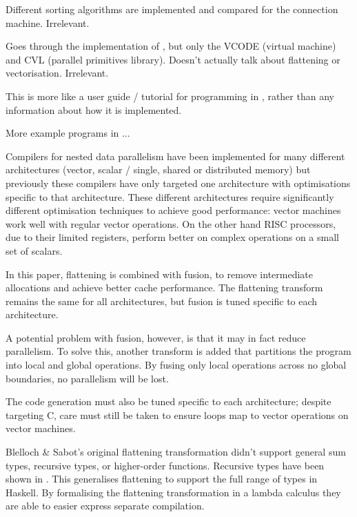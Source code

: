 Different sorting algorithms are implemented and compared for the connection machine. Irrelevant.

Goes through the implementation of \nesl, but only the VCODE (virtual machine) and CVL (parallel primitives library).
Doesn't actually talk about flattening or vectorisation.
Irrelevant.

This is more like a user guide / tutorial for programming in \nesl, rather than any information about how it is implemented.

More example programs in \nesl...


Compilers for nested data parallelism have been implemented for many different architectures (vector, scalar / single, shared or distributed memory)
but previously these compilers have only targeted one architecture with optimisations specific to that architecture.
These different architectures require significantly different optimisation techniques to achieve good performance:
vector machines work well with regular vector operations.
On the other hand RISC processors, due to their limited registers,
perform better on complex operations on a small set of scalars.

In this paper, flattening is combined with fusion, to remove intermediate allocations and achieve better cache performance.
The flattening transform remains the same for all architectures, but fusion is tuned specific to each architecture.

A potential problem with fusion, however, is that it may in fact reduce parallelism. 
To solve this, another transform is added that partitions the program into local and global operations.
By fusing only local operations across no global boundaries, no parallelism will be lost.

The code generation must also be tuned specific to each architecture; despite targeting C,
care must still be taken to ensure loops map to vector operations on vector machines.


Blelloch \& Sabot's original flattening transformation didn't support general sum types, recursive types, or higher-order functions. Recursive types have been shown in \cite{keller1998flattening}.
This generalises flattening to support the full range of types in Haskell.
By formalising the flattening transformation in a lambda calculus they are able to easier express separate compilation.

